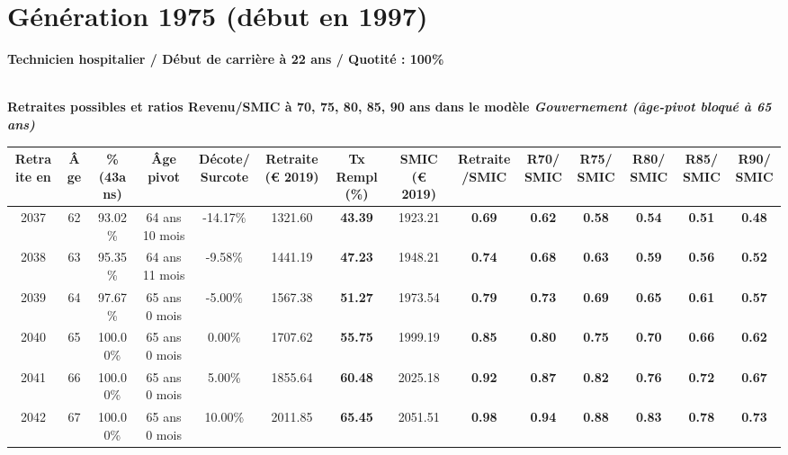 \section{Génération 1975 (début en 1997)\label{TechHosp_100_22_1975_0}} 
 
{\bf \noindent Technicien hospitalier / Début de carrière à 22 ans / Quotité : 100\%}  ~ 

 ~\\{\bf \noindent Retraites possibles et ratios Revenu/SMIC à 70, 75, 80, 85, 90 ans dans le modèle \emph{Gouvernement (âge-pivot bloqué à 65 ans)}}  
 
\begin{adjustbox}{max width=\textwidth} 
\begin{tabular}[htb]{|c|c||c|c|c||c|c||c|c||c|c|c|c|c|} 
\hline 
 Retraite en &  Âge &  \%(43ans) &  Âge pivot &  Décote/Surcote &  Retraite (\euro{} 2019) &  Tx Rempl(\%) &  SMIC (\euro{} 2019) &  Retraite/SMIC &  R70/SMIC &  R75/SMIC &  R80/SMIC &  R85/SMIC &  R90/SMIC \\ 
\hline \hline 
 2037 &  62 &  93.02\% &  64 ans 10 mois &  -14.17\% &  1321.60 &  {\bf 43.39} &  1923.21 &  {\bf {\color{red} 0.69}} &  {\bf {\color{red} 0.62}} &  {\bf {\color{red} 0.58}} &  {\bf {\color{red} 0.54}} &  {\bf {\color{red} 0.51}} &  {\bf {\color{red} 0.48}} \\ 
\hline 
 2038 &  63 &  95.35\% &  64 ans 11 mois &  -9.58\% &  1441.19 &  {\bf 47.23} &  1948.21 &  {\bf {\color{red} 0.74}} &  {\bf {\color{red} 0.68}} &  {\bf {\color{red} 0.63}} &  {\bf {\color{red} 0.59}} &  {\bf {\color{red} 0.56}} &  {\bf {\color{red} 0.52}} \\ 
\hline 
 2039 &  64 &  97.67\% &  65 ans 0 mois &  -5.00\% &  1567.38 &  {\bf 51.27} &  1973.54 &  {\bf {\color{red} 0.79}} &  {\bf {\color{red} 0.73}} &  {\bf {\color{red} 0.69}} &  {\bf {\color{red} 0.65}} &  {\bf {\color{red} 0.61}} &  {\bf {\color{red} 0.57}} \\ 
\hline 
 2040 &  65 &  100.00\% &  65 ans 0 mois &  0.00\% &  1707.62 &  {\bf 55.75} &  1999.19 &  {\bf {\color{red} 0.85}} &  {\bf {\color{red} 0.80}} &  {\bf {\color{red} 0.75}} &  {\bf {\color{red} 0.70}} &  {\bf {\color{red} 0.66}} &  {\bf {\color{red} 0.62}} \\ 
\hline 
 2041 &  66 &  100.00\% &  65 ans 0 mois &  5.00\% &  1855.64 &  {\bf 60.48} &  2025.18 &  {\bf {\color{red} 0.92}} &  {\bf {\color{red} 0.87}} &  {\bf {\color{red} 0.82}} &  {\bf {\color{red} 0.76}} &  {\bf {\color{red} 0.72}} &  {\bf {\color{red} 0.67}} \\ 
\hline 
 2042 &  67 &  100.00\% &  65 ans 0 mois &  10.00\% &  2011.85 &  {\bf 65.45} &  2051.51 &  {\bf {\color{red} 0.98}} &  {\bf {\color{red} 0.94}} &  {\bf {\color{red} 0.88}} &  {\bf {\color{red} 0.83}} &  {\bf {\color{red} 0.78}} &  {\bf {\color{red} 0.73}} \\ 
\hline 
\hline 
\end{tabular} 
\end{adjustbox} 
 
